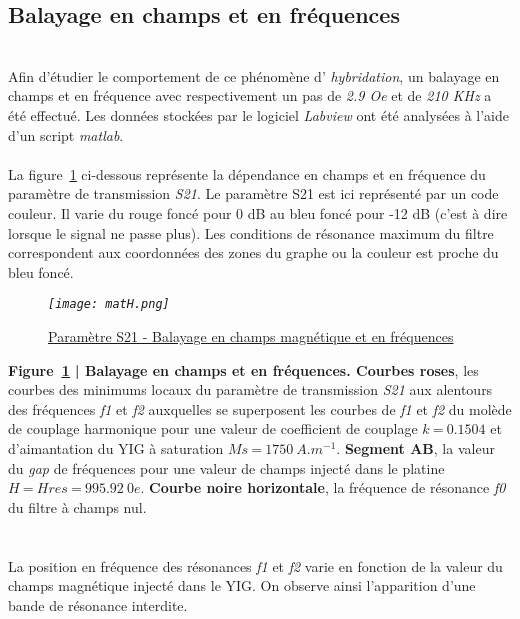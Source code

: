 \documentclass[12pt,fleqn]{book} %
\begin{document}
\subsection{Balayage en champs et en fréquences}
~\\
\noindent Afin d'étudier le comportement de ce phénomène d' \emph{hybridation}, un balayage en champs et en fréquence avec respectivement un pas de \emph{2.9 Oe} et de \emph{210 KHz} a été effectué. Les données stockées par le logiciel \emph{Labview} ont été analysées à l'aide d'un script \emph{matlab}.
~\\\\La figure~\underline{\color{blue}\ref{matH}} ci-dessous représente la dépendance en champs et en fréquence du paramètre de transmission \emph{S21}. Le paramètre S21 est ici représenté par un code couleur. Il varie du rouge foncé pour 0 dB au bleu foncé pour -12 dB (c'est à dire lorsque le signal ne passe plus). Les conditions de résonance maximum du filtre correspondent aux coordonnées des zones du graphe ou la couleur est proche du bleu foncé.
\begin{figure}[H]
	\centering
	\itshape
	\texttt{[image: matH.png]}
	\caption{\label{matH} \underline{Paramètre S21 - Balayage en champs magnétique et en fréquences}}
\end{figure}
\noindent\footnotesize\textbf{Figure~\underline{\color{blue}\ref{matH}} | Balayage en champs et en fréquences. Courbes roses}, les courbes des minimums locaux du paramètre de transmission \emph{S21} aux alentours des fréquences \emph{f1} et \emph{f2} auxquelles se superposent les courbes de \emph{f1} et \emph{f2} du molède de couplage harmonique pour une valeur de coefficient de couplage $k\ \text{=}\ 0.1504$ et d'aimantation du YIG à saturation $Ms\ \text{=}\ 1750\ A.m^{-1}$. \textbf{Segment AB}, la valeur du \emph{gap} de fréquences pour une valeur de champs injecté dans le platine $H\ \text{=}\ Hres\ \text{=}\ 995.92\ 0e$. \textbf{Courbe noire horizontale}, la fréquence de résonance \emph{f0} du filtre à champs nul.
~\\\\
\normalsize
~\\La position en fréquence des résonances \emph{f1} et \emph{f2} varie en fonction de la valeur du champs magnétique injecté dans le YIG. On observe ainsi l'apparition d'une bande de résonance interdite.
\end{document}

